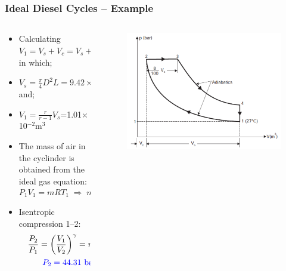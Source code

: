 \documentclass[10pt,compress]{beamer}
\begin{document}
\begin{frame}
 \frametitle{Ideal Diesel Cycles --  Example}
  \begin{columns}
   \begin{column}[c]{0.6\linewidth}
    \begin{itemize}
     \item <1-> Calculating $V_{1}=V_{s}+V_{c}=V_{s}+\displaystyle\frac{V_{s}}{r-1}$ in which;
     \item <2-> $V_{s}=\displaystyle\frac{\pi}{4}D^{2}L=9.42\times 10^{-3}\;m^{3}$ and;
     \item <3-> $V_{1} = \displaystyle\frac{r}{r-1}V_{s}$=1.01$\times$10$^{-2}$m$^{3}$
     \item <4-> The mass of air in the cyclinder is obtained from the ideal gas equation:
      \begin{displaymath}
       P_{1}V_{1}=mRT_{1}\;\Rightarrow\; m= 1.17\times 10^{-2}\;\text{kg/cycle}
      \end{displaymath}
     \item <5-> Isentropic compression  1--2:
      \begin{eqnarray}
       &&\displaystyle\frac{P_{2}}{P_{1}}=\left(\displaystyle\frac{V_{1}}{V_{2}}\right)^{\gamma}=r^{\gamma} \nonumber \\
       && \textcolor{blue}{P_{2}=44.31\text{ bar}}\nonumber
      \end{eqnarray}
    \end{itemize}
   \end{column}
   \begin{column}[c]{0.4\linewidth}
    \begin{figure}%
     \begin{center}
      \includegraphics[width=5.cm,clip]{./Pics/InternalCombustion_IdealDieselCycle_Example1}
     \end{center}
    \end{figure}   
   \end{column}  
  \end{columns}
\end{frame}
\end{document}
